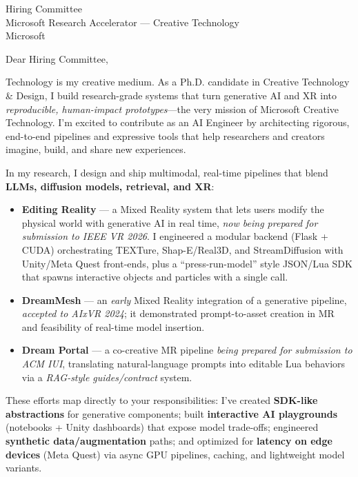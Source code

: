 \documentclass[11pt]{letter}
\begin{document}
\begin{letter}{Hiring Committee\\Microsoft Research Accelerator --- Creative Technology\\Microsoft}
\date{September 8, 2025}
\opening{Dear Hiring Committee,}

Technology is my creative medium. As a Ph.D. candidate in Creative Technology \& Design, I build research-grade systems that turn generative AI and XR into \emph{reproducible, human-impact prototypes}---the very mission of Microsoft Creative Technology. I’m excited to contribute as an AI Engineer by architecting rigorous, end-to-end pipelines and expressive tools that help researchers and creators imagine, build, and share new experiences.

In my research, I design and ship multimodal, real-time pipelines that blend \textbf{LLMs, diffusion models, retrieval, and XR}:
\begin{itemize}
  \item \textbf{Editing Reality} --- a Mixed Reality system that lets users modify the physical world with generative AI in real time, \emph{now being prepared for submission to IEEE VR 2026}. I engineered a modular backend (Flask + CUDA) orchestrating TEXTure, Shap-E/Real3D, and StreamDiffusion with Unity/Meta Quest front-ends, plus a “press-run-model” style JSON/Lua SDK that spawns interactive objects and particles with a single call.
\item \textbf{DreamMesh} --- an \emph{early} Mixed Reality integration of a generative pipeline, \emph{accepted to AIxVR 2024}; it demonstrated prompt-to-asset creation in MR and feasibility of real-time model insertion.

  \item \textbf{Dream Portal} --- a co-creative MR pipeline \emph{being prepared for submission to ACM IUI}, translating natural-language prompts into editable Lua behaviors via a \emph{RAG-style guides/contract} system.
\end{itemize}

These efforts map directly to your responsibilities: I’ve created \textbf{SDK-like abstractions} for generative components; built \textbf{interactive AI playgrounds} (notebooks + Unity dashboards) that expose model trade-offs; engineered \textbf{synthetic data/augmentation} paths; and optimized for \textbf{latency on edge devices} (Meta Quest) via async GPU pipelines, caching, and lightweight model variants.


\end{letter}
\end{document}
